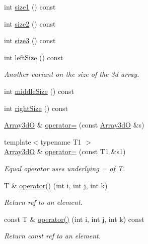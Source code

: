 \begin{DoxyCompactItemize}
\item 
int \mbox{\hyperlink{classADAT_1_1Array3dO_a30149908b955c7eeebec86a24e6afffd}{size1}} () const
\item 
int \mbox{\hyperlink{classADAT_1_1Array3dO_ab4a1fc3cfddf9238d7ab3fefac03ad18}{size2}} () const
\item 
int \mbox{\hyperlink{classADAT_1_1Array3dO_acd5ccea08cb9cde541a396823af21161}{size3}} () const
\item 
int \mbox{\hyperlink{classADAT_1_1Array3dO_a60f0fb62e8b93e6828fc98df271db054}{left\+Size}} () const
\begin{DoxyCompactList}\small\item\em Another variant on the size of the 3d array. \end{DoxyCompactList}\item 
int \mbox{\hyperlink{classADAT_1_1Array3dO_aff38cae908364701dc0fefd386223c55}{middle\+Size}} () const
\item 
int \mbox{\hyperlink{classADAT_1_1Array3dO_a81a9bfa7afe224267642e822ebe09457}{right\+Size}} () const
\item 
\mbox{\hyperlink{classADAT_1_1Array3dO}{Array3dO}} \& \mbox{\hyperlink{classADAT_1_1Array3dO_a11d4d9d221d7e6598675307926a38f4f}{operator=}} (const \mbox{\hyperlink{classADAT_1_1Array3dO}{Array3dO}} \&s)
\item 
{\footnotesize template$<$typename T1 $>$ }\\\mbox{\hyperlink{classADAT_1_1Array3dO}{Array3dO}} \& \mbox{\hyperlink{classADAT_1_1Array3dO_a7f1b73e1e34cf1e21dfac8af86469ee1}{operator=}} (const T1 \&s1)
\begin{DoxyCompactList}\small\item\em Equal operator uses underlying = of T. \end{DoxyCompactList}\item 
T \& \mbox{\hyperlink{classADAT_1_1Array3dO_a7707d5d50d59bd04eb784754e2128075}{operator()}} (int i, int j, int k)
\begin{DoxyCompactList}\small\item\em Return ref to an element. \end{DoxyCompactList}\item 
const T \& \mbox{\hyperlink{classADAT_1_1Array3dO_a3b4254a3812d8a02c4510f4fa635dd9c}{operator()}} (int i, int j, int k) const
\begin{DoxyCompactList}\small\item\em Return const ref to an element. \end{DoxyCompactList}\item 

\end{DoxyCompactItemize}
